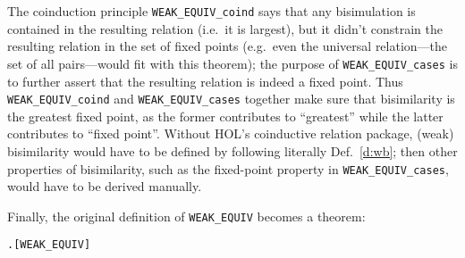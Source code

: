 The coinduction principle \texttt{WEAK_EQUIV_coind} says that any
bisimulation is contained in the resulting relation (i.e.~it is
largest), but it didn't constrain the resulting relation in the set of
fixed points (e.g.~even the universal relation---the set of all
pairs---would fit with this theorem); the
purpose of \texttt{WEAK_EQUIV_cases} is to
further assert that the resulting relation is indeed a
fixed point. Thus \texttt{WEAK_EQUIV_coind} and \texttt{WEAK_EQUIV_cases}
together make sure that bisimilarity is the greatest
fixed point, as
the former contributes to ``greatest'' while the latter
contributes to ``fixed point''.
%
Without HOL's coinductive relation package, (weak) bisimilarity
would have to be defined by following literally
Def.~\ref{d:wb};  then other properties of bisimilarity, such
as the fixed-point property in \texttt{WEAK_EQUIV_cases}, would have to be
derived manually.

Finally, the original definition of \texttt{WEAK_EQUIV}
becomes a theorem:
\begin{alltt}
\HOLTokenTurnstile{}  \HOLSymConst{\HOLTokenWeakEQ}  \HOLSymConst{\HOLTokenEquiv{}} \HOLSymConst{\HOLTokenExists{}}.    \HOLSymConst{\HOLTokenConj{}}  \hfill{[WEAK_EQUIV]}
\end{alltt}


